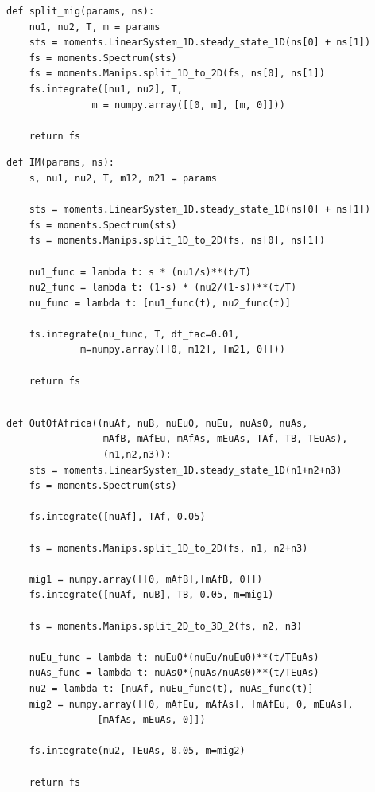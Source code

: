 \documentclass[12pt]{article}
\makeatletter
\newcommand{\py}[1]{\lstinline[breaklines=true,language=Python, showstringspaces=False]@#1@}
\makeatother
\begin{document}
\begin{lstlisting}[caption={\textbf{Split with migration:} At time \py{T} in the past, two population diverge from an equilibrium population, with relative sizes \py{nu1} and \py{nu2} and with symmetric migration at rate \py{m}.}, float]
def split_mig(params, ns):
    nu1, nu2, T, m = params
    sts = moments.LinearSystem_1D.steady_state_1D(ns[0] + ns[1])
    fs = moments.Spectrum(sts)
    fs = moments.Manips.split_1D_to_2D(fs, ns[0], ns[1])
    fs.integrate([nu1, nu2], T, 
    		   m = numpy.array([[0, m], [m, 0]]))

    return fs
\end{lstlisting}

\begin{lstlisting}[caption={\textbf{Two-population isolation-with-migration:} The ancestral population splits into two, with a fraction \py{s} going into pop 1 and fraction \py{1-s} into pop 2. The populations then grow exponentially, with asymmetric migration allowed between them.}, float]
def IM(params, ns):
    s, nu1, nu2, T, m12, m21 = params

    sts = moments.LinearSystem_1D.steady_state_1D(ns[0] + ns[1])
    fs = moments.Spectrum(sts)
    fs = moments.Manips.split_1D_to_2D(fs, ns[0], ns[1])
    
    nu1_func = lambda t: s * (nu1/s)**(t/T)
    nu2_func = lambda t: (1-s) * (nu2/(1-s))**(t/T)
    nu_func = lambda t: [nu1_func(t), nu2_func(t)]

    fs.integrate(nu_func, T, dt_fac=0.01, 
    		 m=numpy.array([[0, m12], [m21, 0]]))

    return fs
\end{lstlisting}

\begin{lstlisting}[caption={\textbf{Out-of-Africa model from Gutenkunst (2009):} This model involves a size change in the ancestral population, a split, another split, and then exponential growth of populations 1 and 2.}, float,label={lst:OOA}]

def OutOfAfrica((nuAf, nuB, nuEu0, nuEu, nuAs0, nuAs, 
                 mAfB, mAfEu, mAfAs, mEuAs, TAf, TB, TEuAs),
                 (n1,n2,n3)):
    sts = moments.LinearSystem_1D.steady_state_1D(n1+n2+n3)
    fs = moments.Spectrum(sts)

    fs.integrate([nuAf], TAf, 0.05)
    
    fs = moments.Manips.split_1D_to_2D(fs, n1, n2+n3)
    
    mig1 = numpy.array([[0, mAfB],[mAfB, 0]])
    fs.integrate([nuAf, nuB], TB, 0.05, m=mig1)
    
    fs = moments.Manips.split_2D_to_3D_2(fs, n2, n3)

    nuEu_func = lambda t: nuEu0*(nuEu/nuEu0)**(t/TEuAs)
    nuAs_func = lambda t: nuAs0*(nuAs/nuAs0)**(t/TEuAs)
    nu2 = lambda t: [nuAf, nuEu_func(t), nuAs_func(t)]
    mig2 = numpy.array([[0, mAfEu, mAfAs], [mAfEu, 0, mEuAs],
    			[mAfAs, mEuAs, 0]])
    
    fs.integrate(nu2, TEuAs, 0.05, m=mig2)
                                
    return fs
\end{lstlisting}
\end{document}
